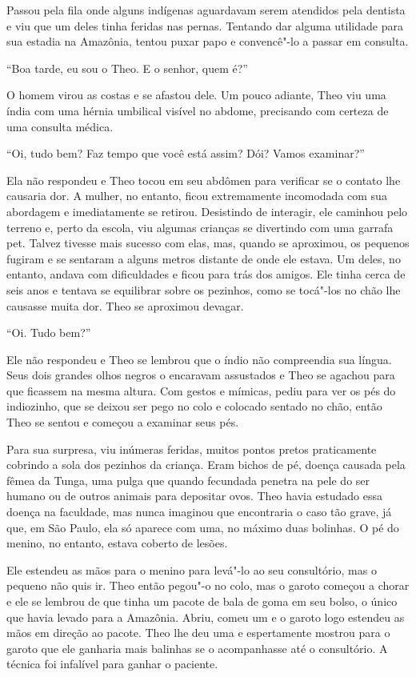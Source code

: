 Passou pela fila onde alguns indígenas aguardavam serem atendidos pela
dentista e viu que um deles tinha feridas nas pernas. Tentando dar
alguma utilidade para sua estadia na Amazônia, tentou puxar papo e
convencê"-lo a passar em consulta.

``Boa tarde, eu sou o Theo. E o senhor, quem é?''

O homem virou as costas e se afastou dele. Um pouco adiante, Theo viu
uma índia com uma hérnia umbilical visível no abdome, precisando com
certeza de uma consulta médica.

``Oi, tudo bem? Faz tempo que você está assim? Dói? Vamos examinar?''

Ela não respondeu e Theo tocou em seu abdômen para verificar se o
contato lhe causaria dor. A mulher, no entanto, ficou extremamente
incomodada com sua abordagem e imediatamente se retirou. Desistindo de
interagir, ele caminhou pelo terreno e, perto da escola, viu algumas
crianças se divertindo com uma garrafa pet. Talvez tivesse mais sucesso
com elas, mas, quando se aproximou, os pequenos fugiram e se sentaram a
alguns metros distante de onde ele estava. Um deles, no entanto, andava
com dificuldades e ficou para trás dos amigos. Ele tinha cerca de seis
anos e tentava se equilibrar sobre os pezinhos, como se tocá"-los no chão
lhe causasse muita dor. Theo se aproximou devagar.

``Oi. Tudo bem?''

Ele não respondeu e Theo se lembrou que o índio não compreendia sua
língua. Seus dois grandes olhos negros o encaravam assustados e Theo se
agachou para que ficassem na mesma altura. Com gestos e mímicas, pediu
para ver os pés do indiozinho, que se deixou ser pego no colo e colocado
sentado no chão, então Theo se sentou e começou a examinar seus pés.

Para sua surpresa, viu inúmeras feridas, muitos pontos pretos
praticamente cobrindo a sola dos pezinhos da criança. Eram bichos de pé,
doença causada pela fêmea da Tunga, uma pulga que quando fecundada
penetra na pele do ser humano ou de outros animais para depositar ovos.
Theo havia estudado essa doença na faculdade, mas nunca imaginou que
encontraria o caso tão grave, já que, em São Paulo, ela só aparece com
uma, no máximo duas bolinhas. O pé do menino, no entanto, estava coberto
de lesões.

Ele estendeu as mãos para o menino para levá"-lo ao seu consultório, mas
o pequeno não quis ir. Theo então pegou"-o no colo, mas o garoto começou
a chorar e ele se lembrou de que tinha um pacote de bala de goma em seu
bolso, o único que havia levado para a Amazônia. Abriu, comeu um e o
garoto logo estendeu as mãos em direção ao pacote. Theo lhe deu uma e
espertamente mostrou para o garoto que ele ganharia mais balinhas se o
acompanhasse até o consultório. A técnica foi infalível para ganhar o
paciente.

